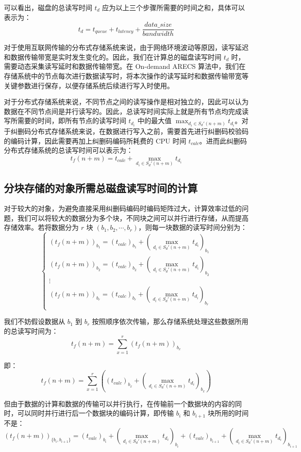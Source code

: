 可以看出，磁盘的总读写时间 $t_{d}$ 应为以上三个步骤所需要的时间之和，具体可以表示为：
$$
t_{d}=t_{queue}+t_{latency}+\dfrac{data\_size}{bandwidth}
$$

对于使用互联网传输的分布式存储系统来说，由于网络环境波动等原因，读写延迟和数据传输带宽是实时发生变化的。因此，我们在计算总的磁盘读写时间 $t_{d}$ 时，需要动态采集读写延时和数据传输带宽。在 On-demand ARECS 算法中，我们在存储系统中的节点每次进行数据读写时，将本次操作的读写延时和数据传输带宽等关键参数进行保存，以便存储系统后续进行写入时使用。

对于分布式存储系统来说，不同节点之间的读写操作是相对独立的，因此可以认为数据在不同节点间是并行读写的。因此，总读写时间实际上就是所有节点均完成读写所需要的时间，即所有节点的读写时间 $t_{d_i}$ 中的最大值 $\displaystyle\max_{d_{i}{\in}S_{d}'(n+m)}t_{d_i}$。对于纠删码分布式存储系统来说，在数据进行写入之前，需要首先进行纠删码校验码的编码计算，因此需要再加上纠删码编码所耗费的 CPU 时间 $t_{calc}$。进而此纠删码分布式存储系统的总读写时间可以表示为：
$$
t_{f}(n+m)=t_{calc}+\max_{d_{i}{\in}S_{d}'(n+m)}t_{d_i}
$$
\subsection{分块存储的对象所需总磁盘读写时间的计算}
对于较大的对象，为避免直接采用纠删码编码时编码矩阵过大，计算效率过低的问题，我们可以将较大的数据分为多个块，不同块之间可以并行进行存储，从而提高存储效率。若将数据分为 $r$ 块 $(b_{1},b_{2},\cdots,b_{r})$，则每一块数据的读写时间分别为：
$$
\begin{cases}
\left(t_{f}(n+m)\right)_{b_{1}}=(t_{calc})_{b_{1}}+\left(\displaystyle\max_{d_{i}{\in}S_{d}'(n+m)}t_{d_i}\right)_{b_{1}}\\
\left(t_{f}(n+m)\right)_{b_{2}}=(t_{calc})_{b_{2}}+\left(\displaystyle\max_{d_{i}{\in}S_{d}'(n+m)}t_{d_i}\right)_{b_{2}}\\
\vdots\\
\left(t_{f}(n+m)\right)_{b_{r}}=(t_{calc})_{b_{r}}+\left(\displaystyle\max_{d_{i}{\in}S_{d}'(n+m)}t_{d_i}\right)_{b_{r}}\\
\end{cases}
$$

我们不妨假设数据从 $b_{1}$ 到 $b_{r}$ 按照顺序依次传输，那么存储系统处理这些数据所用的总读写时间为：
$$
t_{f}(n+m)=\sum_{x=1}^{r}\left(t_{f}(n+m)\right)_{b_{x}}
$$

即：
$$
t_{f}(n+m)=\sum_{x=1}^{r}\left((t_{calc})_{b_{x}}+\left(\max_{d_{i}{\in}S_{d}'(n+m)}t_{d_i}\right)_{b_{x}}\right)
$$

但由于数据的计算和数据的传输可以并行执行，在传输前一个数据块的内容的同时，可以同时并行进行后一个数据块的编码计算，即传输 $b_{i}$ 和 $b_{i+1}$ 块所用的时间不是：
$$
\left(t_{f}(n+m)\right)_{\{b_{i},b_{i+1}\}}=(t_{calc})_{b_{i}}+\left(\max_{d_{i}{\in}S_{d}'(n+m)}t_{d_i}\right)_{b_{i}}+(t_{calc})_{b_{i+1}}+\left(\max_{d_{i}{\in}S_{d}'(n+m)}t_{d_i}\right)_{b_{i+1}}
$$

